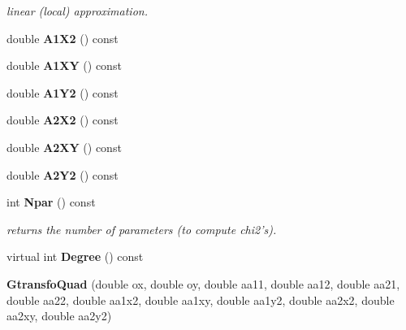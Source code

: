 \begin{CompactItemize}
\begin{CompactList}\small\item\em linear (local) approximation.\item\end{CompactList}\item 
{}
double {\bf A1X2} () const\label{class_gtransfoquad_a11}

\item 
{}
double {\bf A1XY} () const\label{class_gtransfoquad_a12}

\item 
{}
double {\bf A1Y2} () const\label{class_gtransfoquad_a13}

\item 
{}
double {\bf A2X2} () const\label{class_gtransfoquad_a14}

\item 
{}
double {\bf A2XY} () const\label{class_gtransfoquad_a15}

\item 
{}
double {\bf A2Y2} () const\label{class_gtransfoquad_a16}

\item 
{}
int {\bf Npar} () const\label{class_gtransfoquad_a17}

\begin{CompactList}\small\item\em returns the number of parameters (to compute chi2's).\item\end{CompactList}\item 
{}
virtual int {\bf Degree} () const\label{class_gtransfoquad_a18}

\item 
{}
{\bf Gtransfo\-Quad} (double ox, double oy, double aa11, double aa12, double aa21, double aa22, double aa1x2, double aa1xy, double aa1y2, double aa2x2, double aa2xy, double aa2y2)\label{class_gtransfoquad_a19}

\end{CompactItemize}
